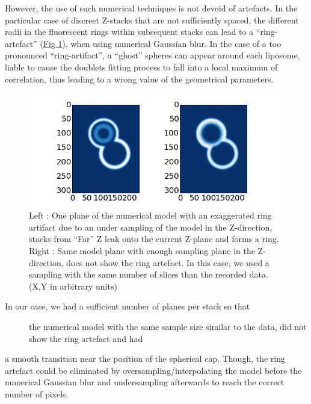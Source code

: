 \documentclass[A4paperpaper,11pt,english]{sphinxmanual}
\begin{document}
However, the use of such numerical techniques is not devoid of artefacts.  In the particular case of
discreet Z-stacks that are not sufficiently spaced, the different radii in the
fluorescent rings within subsequent stacks can lead to a ``ring-artefact'' (\hyperref[index-latex:ring-artifact]{Fig  \ref*{index-latex:ring-artifact}}), when using numerical Gaussian blur. In the case of a too
pronounced ``ring-artifact'', a ``ghost'' spheres can appear around each liposome,
liable to cause the doublets fitting process to fall into a local
maximum of correlation, thus leading to a wrong value of the geometrical
parameters.
\begin{figure}[htbp]
\centering
\capstart

\includegraphics[width=0.700\linewidth]{ring_artifact.png}
\caption{Left : One plane of the numerical model with an exaggerated ring artifact due
to an under sampling of the model in the Z-direction, stacks from ``Far'' Z
leak onto the current Z-plane and forms a ring.  Right : Same model plane  with enough sampling plane in the Z-direction, does not show the ring
artefact. In this case, we used a sampling with the same number of slices than
the recorded data. (X,Y in arbitrary units)}\label{index-latex:ring-artifact}\end{figure}
\begin{description}
\item[{In our case, we had a sufficient number of planes per stack so that}] \leavevmode
the numerical model with the same sample size similar to the data, did not show the ring artefact and had

\end{description}

a smooth transition near the position of the spherical cap. Though, the ring
artefact could be eliminated by oversampling/interpolating the model before the
numerical Gaussian blur and undersampling afterwards to reach the correct number of
pixels.
\end{document}
